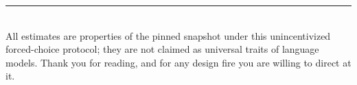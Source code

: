\documentclass[11pt]{article}
\begin{document}
\vspace{6pt}
{\color{rulegray}\rule{\linewidth}{0.8pt}}\\[3pt]
{\footnotesize\color{mutegray} All estimates are properties of the pinned snapshot under this
unincentivized forced-choice protocol; they are not claimed as universal traits of language models.
Thank you for reading, and for any design fire you are willing to direct at it.}
\end{document}
